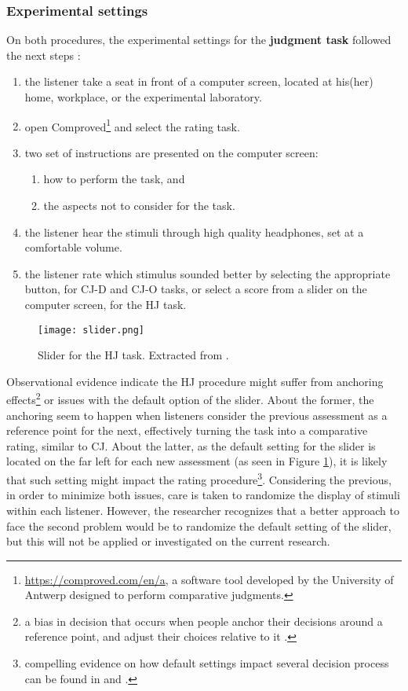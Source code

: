 \subsubsection{Experimental settings} \label{ss_sect:expset}
%
On both procedures, the experimental settings for the \textbf{judgment task} followed the next steps \citep{Boonen_et_al_2020, Boonen_et_al_2021}:
%
\begin{enumerate}
	\item the listener take a seat in front of a computer screen, located at his(her) home, workplace, or the experimental laboratory.
	\item open Comproved\footnote{\url{https://comproved.com/en/a}, a software tool developed by the University of Antwerp designed to perform comparative judgments.} and select the rating task.
	\item two set of instructions are presented on the computer screen:
	\begin{enumerate}
		\item how to perform the task, and
		\item the aspects not to consider for the task.
	\end{enumerate}
	\item the listener hear the stimuli through high quality headphones, set at a comfortable volume.
	\item the listener rate which stimulus sounded better by selecting the appropriate button, for CJ-D and CJ-O tasks, or select a score from a slider on the computer screen, for the HJ task.
\end{enumerate}
%
\begin{figure}[h]
	\centering
	\texttt{[image: slider.png]}
	\caption[Slider for the HJ task.]%
	{Slider for the HJ task. Extracted from \citet{Boonen_et_al_2021}.}
	\label{fig:slider}
\end{figure}
%
Observational evidence indicate the HJ procedure might suffer from anchoring effects\footnote{a bias in decision that occurs when people anchor their decisions around a reference point, and adjust their choices relative to it \cite{Baddeley_2017, Kahneman_2013}.} or issues with the default option of the slider. About the former, the anchoring seem to happen when listeners consider the previous assessment as a reference point for the next, effectively turning the task into a comparative rating, similar to CJ. About the latter, as the default setting for the slider is located on the far left for each new assessment (as seen in Figure \ref{fig:slider}), it is likely that such setting might impact the rating procedure\footnote{compelling evidence on how default settings impact several decision process can be found in \citet{Kahneman_2013} and \citet{Johnson_et_al_2003}.}. Considering the previous, in order to minimize both issues, care is taken to randomize the display of stimuli within each listener. However, the researcher recognizes that a better approach to face the second problem would be to randomize the default setting of the slider, but this will not be applied or investigated on the current research. 

